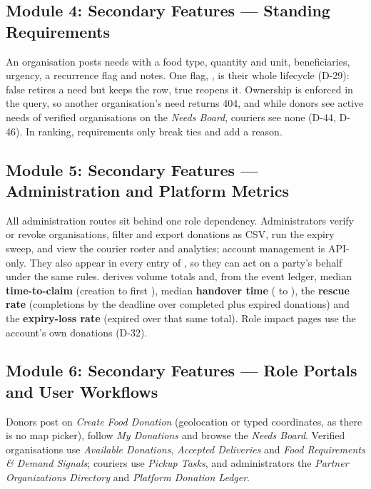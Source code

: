 \subsection{Module 4: Secondary Features --- Standing Requirements}
\label{sec:module-requirements}

An organisation posts needs with a food type, quantity and unit, beneficiaries,
urgency, a recurrence flag and notes. One flag, , is their whole
lifecycle (D-29): false retires a need but keeps the row, true reopens it.
Ownership is enforced in the query, so another
organisation's need returns 404, and while donors see active needs of verified
organisations on the \emph{Needs Board}, couriers see none (D-44, D-46). In
ranking, requirements only break ties and add a reason.

\subsection{Module 5: Secondary Features --- Administration and Platform Metrics}
\label{sec:module-admin}

All administration routes sit behind one role dependency. Administrators verify
or revoke organisations, filter and export donations as CSV, run the expiry
sweep, and view the courier roster and analytics; account management is API-only.
They also appear in every entry of , so they can act on a
party's behalf under the same rules.  derives volume
totals and, from the event ledger, median \textbf{time-to-claim} (creation to
first ), median \textbf{handover time} ( to
), the \textbf{rescue rate} (completions by the deadline over
completed plus expired donations) and the \textbf{expiry-loss rate} (expired over
that same total). Role impact pages use the account's own donations (D-32).

\subsection{Module 6: Secondary Features --- Role Portals and User Workflows}
\label{sec:module-portals}

Donors post on \emph{Create Food Donation} (geolocation or typed coordinates, as
there is no map picker), follow \emph{My Donations} and browse the \emph{Needs
Board}. Verified organisations use \emph{Available Donations}, \emph{Accepted
Deliveries} and \emph{Food Requirements \& Demand Signals}; couriers use
\emph{Pickup Tasks}, and administrators the \emph{Partner Organizations
Directory} and \emph{Platform Donation Ledger}.

